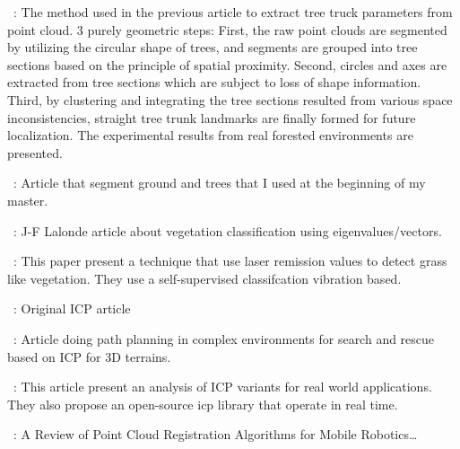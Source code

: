 ~\cite{Iagnemma2012}:
The method used in the previous article to extract tree truck parameters from point cloud. 3 purely geometric steps: First, the raw point clouds are segmented by utilizing the circular shape of trees, and segments are grouped into tree sections based on the principle of spatial proximity. Second, circles and axes are extracted from tree sections which are subject to loss of shape information. Third, by clustering and integrating the tree sections resulted from various space inconsistencies, straight tree trunk landmarks are finally formed for future localization. The experimental results from real forested environments are presented.

~\cite{Mcdaniel2012}:
Article that segment ground and trees that I used at the beginning of my master. 

~\cite{Lalonde2006}:
J-F Lalonde article about vegetation classification using eigenvalues/vectors. 

~\cite{Wurm2009}:
This paper present a technique that use laser remission values to detect grass like vegetation. They use a self-supervised classifcation vibration based. 

~\cite{Besl1992}:
Original ICP article

~\cite{Colas2013}:
Article doing path planning in complex environments for search and rescue based on ICP for 3D terrains. 

~\cite{Pomerleau2013}:
This article present an analysis of ICP variants for real world applications. They also propose an open-source icp library that operate in real time.  

~\cite{Pomerleau2015a}:
A Review of Point Cloud Registration Algorithms for Mobile Robotics\dots


